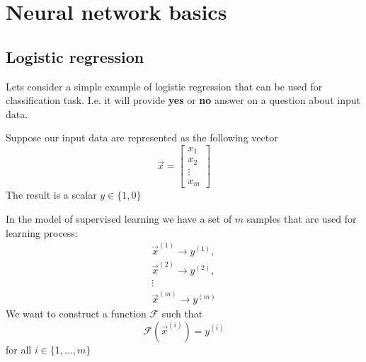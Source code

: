 \chapter{Neural network basics}

\section{Logistic regression}
Lets consider a simple example of logistic regression that can be used for
classification task. I.e. it will provide \textbf{yes} or \textbf{no} answer on
a question about input data.

Suppose our input data are represented as the following vector
\[
\vec{x} =
\begin{bmatrix}
  x_{1} \\
  x_{2} \\
  \vdots \\
  x_{m}
\end{bmatrix}
\]
The result is a scalar $y \in \{1,0\}$

In the model of supervised learning we have a set of $m$ samples that are used
for learning process:
\[
\begin{array}{c}
  \vec{x}^{(1)} \rightarrow y^{(1)}, \\
  \vec{x}^{(2)} \rightarrow y^{(2)}, \\
  \vdots \\
  \vec{x}^{(m)} \rightarrow y^{(m)}
\end{array}
\]
We want to construct a function $\mathcal{F}$ such that
\[
\mathcal{F}\left(\vec{x}^{(i)}\right) = y^{(i)}
\]
for all $i \in \{1, \dots, m\}$

